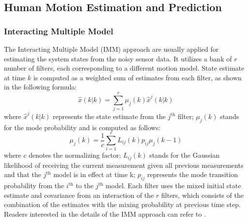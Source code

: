 \documentclass[letterpaper, 10 pt, conference]{ieeeconf}
\begin{document}
	\subsection{Human Motion Estimation and Prediction}\label{subsec:human_track}
	\subsubsection{Interacting Multiple Model}\label{subsec:imm}
	
	The Interacting Multiple Model (IMM) approach are usually applied for estimating the system states from the noisy sensor data.
	It utilizes a bank of $r$ number of filters, each corresponding to a different motion model.
	State estimate at time $k$ is computed as a weighted sum of estimates from each filter, as shown in the following formula:
	\small\begin{equation}
		\hat{x}(k|k)=\sum\limits_{j=1}^{r}\mu_j(k)\hat{x}^j(k|k) \label{eqn:imm_eq}
	\end{equation}\normalsize
	where $\hat{x}^j(k|k)$ represents the state estimate from the $j^\text{th}$ filter; $\mu_j(k)$ stands for the mode probability and is computed as follows:
	\small\[
	\mu_j(k)=\frac{1}{c}\sum\limits_{i=1}^{r}L_{ij}(k)p_{ij}\mu_j(k-1)
	\]\normalsize
	where $c$ denotes the normalizing factor; $L_{ij}(k)$ stands for the Gaussian likelihood of receiving the current measurement given all previous measurements and that the $j^\text{th}$ model is in effect at time k; $p_{ij}$ represents the mode transition probability from the $i^\text{th}$ to the $j^\text{th}$ model. 
	Each filter uses the mixed initial state estimate and covariance from an interaction of the $r$ filters, which consists of the combination of the estimates with the mixing probability at previous time step.
	Readers interested in the details of the IMM approach can refer to \cite{yaakov2001estimation}.
	
\end{document}
